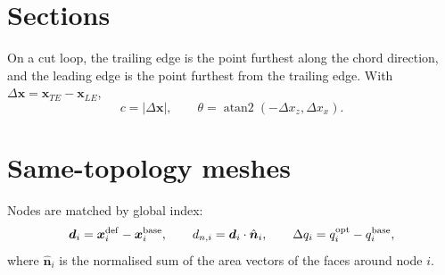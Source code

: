 \documentclass[10pt,a4paper]{article}
\newcommand{\vect}[1]{\bm{#1}}
\begin{document}
\section*{Sections}
On a cut loop, the trailing edge is the point furthest along the chord direction, and the
leading edge is the point furthest from the trailing edge. With
$\Delta\vect x=\vect x_{TE}-\vect x_{LE}$,
\[
  c=|\Delta\vect x|,\qquad \theta=\operatorname{atan2}(-\Delta x_z,\Delta x_x).
\]

\section*{Same-topology meshes}
Nodes are matched by global index:
\[
  \vect d_i=\vect x_i^{\rm def}-\vect x_i^{\rm base},\qquad
  d_{n,i}=\vect d_i\cdot\hat{\vect n}_i,\qquad
  \Delta q_i=q_i^{\rm opt}-q_i^{\rm base},
\]
where $\hat{\vect n}_i$ is the normalised sum of the area vectors of the faces around node $i$.



\end{document}
